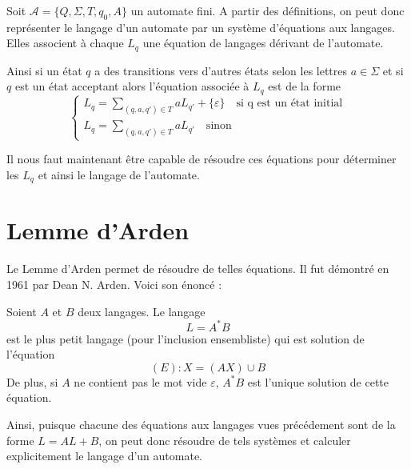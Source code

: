 \begin{proposition}
    Soit $ \mathcal{A} = \{Q, \Sigma, T, q_0, A\}$ un automate fini.
    A partir des définitions, on peut donc représenter le langage d'un automate par un système d'équations aux langages. 
    Elles associent à chaque $L_q$ une équation de langages dérivant de l'automate. 
    
    \vspace{0.2cm}
    
    Ainsi si un état $q$ a des transitions vers d'autres états selon les lettres $a \in \Sigma$ et si $q$ est un état 
    acceptant alors l'équation associée à $L_q$ est de la forme 
        \[ 
            \begin{cases}
                L_q = \sum_{(q,a,q') \in T} a L_{q'} + \{\varepsilon\}  \quad \text{si q est un état initial} \\ 
                L_q = \sum_{(q,a,q') \in T} a L_{q'} \quad \text{sinon}
            \end{cases}
        \] 
\end{proposition}

Il nous faut maintenant être capable de résoudre ces équations pour déterminer les $L_q$ et ainsi le langage de l'automate. 



\section{Lemme d'Arden}

Le Lemme d'Arden permet de résoudre de telles équations. Il fut démontré en 1961 par Dean N. Arden. Voici son énoncé : 

\begin{lemma}[Arden]
    Soient $A$ et $B$ deux langages. Le langage 
        \[ \boxed{ L = A^*B } \]
    est le plus petit langage (pour l'inclusion ensembliste) qui est solution de l'équation 
        \[ \boxed{ (E) : X = (AX) \cup B } \] 
    De plus, si $A$ ne contient pas le mot vide $\varepsilon$, $A^*B$ est l'unique solution de cette équation. 
\end{lemma}

Ainsi, puisque chacune des équations aux langages vues précédement sont de la forme $ L = AL + B$, on peut donc 
résoudre de tels systèmes et calculer explicitement le langage d'un automate. 

